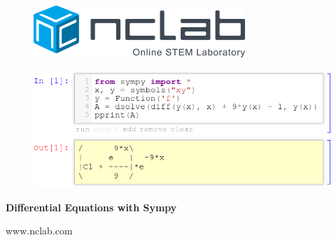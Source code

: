 \documentclass{article}
\begin{document}
\large

\vbox{}
\begin{figure}[!ht]
\includegraphics[width=8cm]{img/logo.png}
\vspace{29mm}
\end{figure}

\begin{figure}[!ht]
\begin{center}
\hspace{-20mm}
\includegraphics[width=14cm]{img/intro-frontpage.png}
\vspace{34mm}
\end{center}
\end{figure}

\centerline{\Huge \bf Differential Equations with Sympy}

\vfill

\centerline{\Large www.nclab.com}

\newpage




\section*{}
\small


\end{document}
